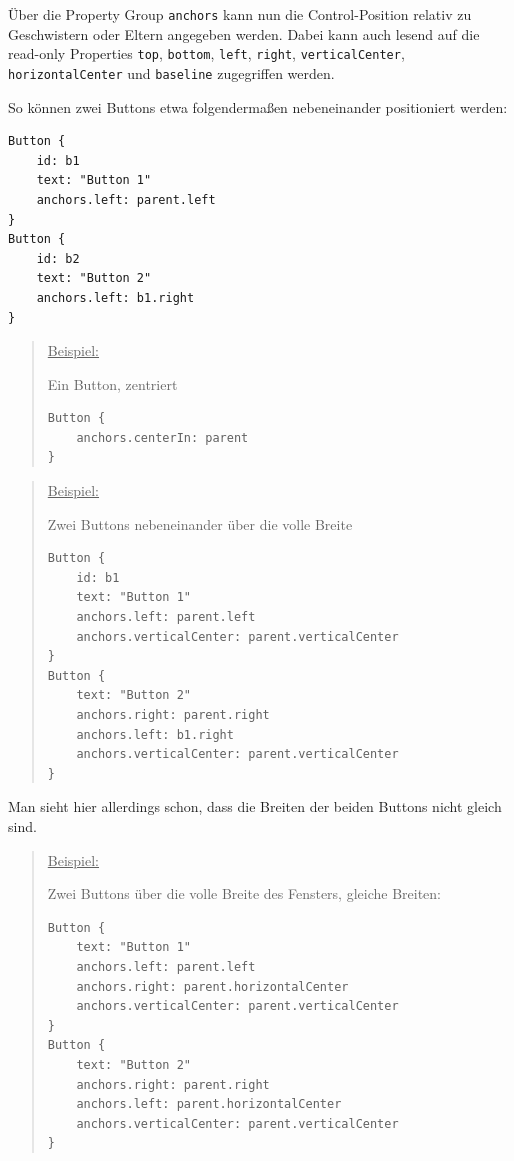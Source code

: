 \documentclass[a4paper]{article}
\begin{document}
Über die Property Group \verb~anchors~ kann nun die Control-Position relativ zu Geschwistern oder Eltern angegeben werden. Dabei kann auch lesend auf die read-only Properties \verb~top~, \verb~bottom~, \verb~left~, \verb~right~, \verb~verticalCenter~, \verb~horizontalCenter~ und \verb~baseline~ zugegriffen werden.

So können zwei Buttons etwa folgendermaßen nebeneinander positioniert werden:

\begin{verbatim}
Button {
    id: b1
    text: "Button 1"
    anchors.left: parent.left
}
Button {
    id: b2
    text: "Button 2"
    anchors.left: b1.right
}
\end{verbatim}

\begin{quote}
\uline{Beispiel:}

Ein Button, zentriert
\begin{verbatim}
Button {
    anchors.centerIn: parent
}
\end{verbatim}
\end{quote}

\begin{quote}
\uline{Beispiel:}

Zwei Buttons nebeneinander über die volle Breite
\begin{verbatim}
Button {
    id: b1
    text: "Button 1"
    anchors.left: parent.left
    anchors.verticalCenter: parent.verticalCenter
}
Button {
    text: "Button 2"
    anchors.right: parent.right
    anchors.left: b1.right
    anchors.verticalCenter: parent.verticalCenter
}
\end{verbatim}
\end{quote}

Man sieht hier allerdings schon, dass die Breiten der beiden Buttons nicht gleich sind.

\begin{quote}
\uline{Beispiel:}

Zwei Buttons über die volle Breite des Fensters, gleiche Breiten:
\begin{verbatim}
Button {
    text: "Button 1"
    anchors.left: parent.left
    anchors.right: parent.horizontalCenter
    anchors.verticalCenter: parent.verticalCenter
}
Button {
    text: "Button 2"
    anchors.right: parent.right
    anchors.left: parent.horizontalCenter
    anchors.verticalCenter: parent.verticalCenter
}
\end{verbatim}
\end{quote}
\end{document}
